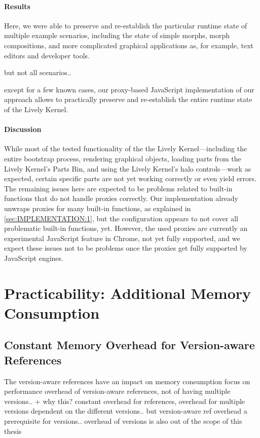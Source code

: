 \paragraph{Results}
Here, we were able to preserve and re-establish the particular runtime state of multiple example scenarios, including the state of simple morphs, morph compositions, and more complicated graphical applications as, for example, text editors and developer tools.

but not all scenarios..

except for a few known cases, our proxy-based JavaScript implementation of our approach allows to practically preserve and re-establish the entire runtime state of the Lively Kernel.

\paragraph{Discussion}
While most of the tested functionality of the the Lively Kernel---including the entire bootstrap process, rendering graphical objects, loading parts from the Lively Kernel's Parts Bin, and using the Lively Kernel's halo controls---work as expected, certain specific parts are not yet working correctly or even yield errors.
The remaining issues here are expected to be problems related to built-in functions that do not handle proxies correctly.
Our implementation already unwraps proxies for many built-in functions, as explained in \ref{sec:IMPLEMENTATION:1}, but the configuration appears to not cover all problematic built-in functions, yet.
However, the used proxies are currently an experimental JavaScript feature in Chrome, not yet fully supported, and we expect these issues not to be problems once the proxies get fully supported by JavaScript engines.


\section{Practicability: Additional Memory Consumption} \label{sec:DISCUSSION:2}


\subsection{Constant Memory Overhead for Version-aware References}

The version-aware references have an impact on memory consumption
focus on performance overhead of version-aware references, not of having multiple versions.. + why this? constant overhead for references, overhead for multiple versions dependent on the different versions.. but version-aware ref overhead a prerequisite for versions.. overhead of versions is also out of the scope of this thesis

